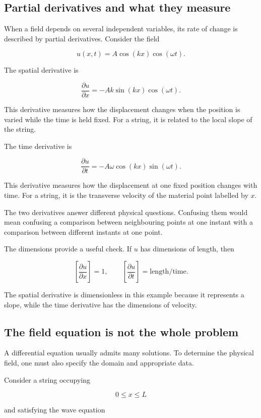 \subsection{Partial derivatives and what they measure}

When a field depends on several independent variables, its rate of change is described by partial derivatives. Consider the field

\[
u(x,t)=A\cos(kx)\cos(\omega t).
\]

The spatial derivative is

\[
\frac{\partial u}{\partial x}
=
-Ak\sin(kx)\cos(\omega t).
\]

This derivative measures how the displacement changes when the position is varied while the time is held fixed. For a string, it is related to the local slope of the string.

The time derivative is

\[
\frac{\partial u}{\partial t}
=
-A\omega\cos(kx)\sin(\omega t).
\]

This derivative measures how the displacement at one fixed position changes with time. For a string, it is the transverse velocity of the material point labelled by \(x\).

The two derivatives answer different physical questions. Confusing them would mean confusing a comparison between neighbouring points at one instant with a comparison between different instants at one point.

The dimensions provide a useful check. If \(u\) has dimensions of length, then

\[
\left[\frac{\partial u}{\partial x}\right]=1,
\qquad
\left[\frac{\partial u}{\partial t}\right]
=\mathrm{length}/\mathrm{time}.
\]

The spatial derivative is dimensionless in this example because it represents a slope, while the time derivative has the dimensions of velocity.

\subsection{The field equation is not the whole problem}

A differential equation usually admits many solutions. To determine the physical field, one must also specify the domain and appropriate data.

Consider a string occupying

\[
0\leq x\leq L
\]

and satisfying the wave equation

